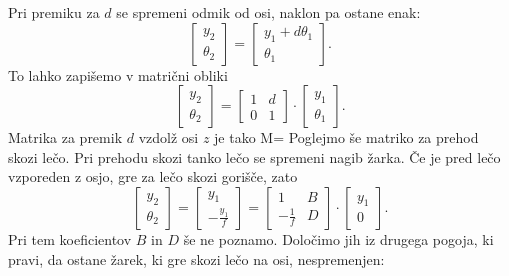 Pri premiku za $d$ se spremeni odmik od osi, naklon pa ostane enak:
\begin{equation}
\left[\begin{array}{c}
y_{2}\\
\theta_{2}
\end{array}\right]=\left[\begin{array}{c}
y_{1}+d\theta_{1}\\
\theta_{1}
\end{array}\right].
\end{equation}
To lahko zapišemo v matrični obliki
\begin{equation}
\left[\begin{array}{c}
y_{2}\\
\theta_{2}
\end{array}\right]=\left[\begin{array}{cc}
1 & d\\
0 & 1
\end{array}\right]\cdot\left[\begin{array}{c}
y_{1}\\
\theta_{1}
\end{array}\right].
\end{equation}
Matrika za premik $d$ vzdolž osi $z$ je tako
\beq
M= \left[\begin{array}{cc}
1 & d\\
0 & 1
\end{array}\right]
\eeq
Poglejmo še matriko za prehod skozi lečo. 
Pri prehodu skozi tanko lečo se spremeni nagib žarka. Če je pred
lečo vzporeden z osjo, gre za lečo skozi gorišče, zato 
\begin{equation}
\left[\begin{array}{c}
y_{2}\\
\theta_{2}
\end{array}\right]=\left[\begin{array}{c}
y_{1}\\
-\frac{y_{1}}{f}
\end{array}\right]=\left[\begin{array}{cc}
1 & B\\
-\frac{1}{f} & D
\end{array}\right]\cdot\left[\begin{array}{c}
y_{1}\\
0
\end{array}\right].
\end{equation}
Pri tem koeficientov $B$ in $D$ še ne poznamo. Določimo jih iz drugega pogoja, 
ki pravi, da ostane žarek, ki gre skozi lečo na osi, nespremenjen: 
